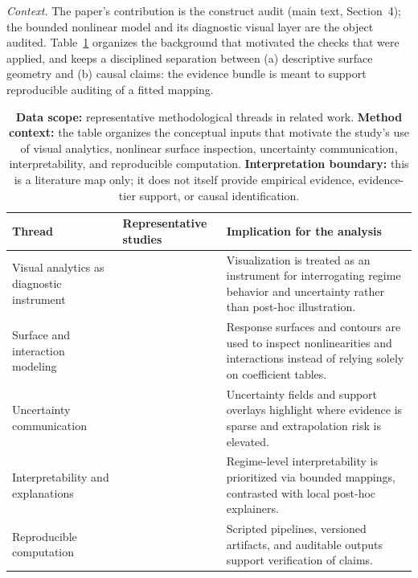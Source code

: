 \documentclass[11pt]{article}
\begin{document}
\begingroup

\noindent\justifying
\textit{Context.} The paper's contribution is the construct audit (main text, Section~4); the bounded nonlinear model and its diagnostic visual layer are the object audited. Table~\ref{tab:related_work_summary} organizes the background that motivated the checks that were applied, and keeps a disciplined separation between (a) descriptive surface geometry and (b) causal claims: the evidence bundle is meant to support reproducible auditing of a fitted mapping.
\begin{table}[t]
    \centering
    \small
    \caption{\textbf{Data scope:} representative methodological threads in related work. \textbf{Method context:} the table organizes the conceptual inputs that motivate the study's use of visual analytics, nonlinear surface inspection, uncertainty communication, interpretability, and reproducible computation. \textbf{Interpretation boundary:} this is a literature map only; it does not itself provide empirical evidence, evidence-tier support, or causal identification.}
    \label{tab:related_work_summary}
    \begin{tabular}{p{}p{}p{}}
        \toprule
        Thread & Representative studies & Implication for the analysis \\
        \midrule
        Visual analytics as diagnostic instrument & \parencite{ThomasCook2005IlluminatingPath,Keim2010MasteringVisualAnalytics} & Visualization is treated as an instrument for interrogating regime behavior and uncertainty rather than post-hoc illustration. \\
        Surface and interaction modeling & \parencite{Hastie2009ESL,Cleveland1993VisualizingData,Tufte2001VisualDisplay} & Response surfaces and contours are used to inspect nonlinearities and interactions instead of relying solely on coefficient tables. \\
        Uncertainty communication & \parencite{MacEachren2005VisualizingUncertainty,CorrellGleicher2014ErrorBars,HullmanResnickAdar2015HOPs} & Uncertainty fields and support overlays highlight where evidence is sparse and extrapolation risk is elevated. \\
        Interpretability and explanations & \parencite{Molnar2022IML,Ribeiro2016LIME,Lundberg2017SHAP} & Regime-level interpretability is prioritized via bounded mappings, contrasted with local post-hoc explainers. \\
        Reproducible computation & \parencite{Peng2011Reproducible,Sandve2013TenSimpleRules,StoddenSeilerMa2018PNAS} & Scripted pipelines, versioned artifacts, and auditable outputs support verification of claims. \\
        \bottomrule
    \end{tabular}
\end{table}
\end{document}
